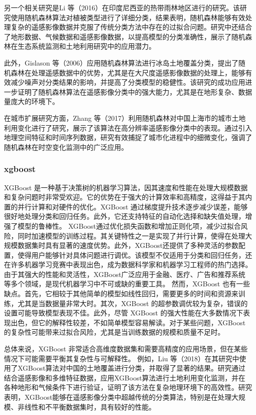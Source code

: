 \documentclass{article}
\begin{document}
	另一个相关研究是Li 等（2016）在印度尼西亚的热带雨林地区进行的研究。该研究使用随机森林算法对植被类型进行了详细分类，结果表明，随机森林能够有效处理复杂的遥感影像数据并克服了传统分类方法中存在的过拟合问题。研究中还结合了地形数据、气候数据和遥感影像数据，以提高模型的分类准确性，展示了随机森林在生态系统监测和土地利用研究中的应用潜力。
	
	此外，Gislason 等（2006）应用随机森林算法进行冰岛土地覆盖分类，提出了随机森林在处理遥感数据中的优势，尤其是在大尺度遥感影像数据的处理上，能够有效减少噪声对分类结果的影响，并提高了分类模型的稳健性。该研究的成功应用进一步证明了随机森林算法在遥感影像分类中的强大能力，尤其是在地形复杂、数据量庞大的环境下。
	
	在城市扩展研究方面，Zhang 等（2017）利用随机森林对中国上海市的城市土地利用变化进行了研究，展示了该算法在高分辨率遥感影像分类中的表现。通过引入地理空间特征和时间序列数据，研究有效捕捉了城市化进程中的细微变化，强调了随机森林在时空变化监测中的广泛应用。
	
	
	\subsubsection{xgboost}
	XGBoost 是一种基于决策树的机器学习算法，因其速度和性能在处理大规模数据和复杂问题时非常受欢迎。它的优势在于强大的计算效率和高精度，这得益于其内置的并行计算和对硬件的优化。XGBoost 通过梯度提升技术逐步减少误差，能够很好地处理分类和回归任务。此外，它还支持特征的自动化选择和缺失值处理，增强了模型的鲁棒性。
	XGBoost通过优化损失函数和增加正则化项，减少过拟合风险，同时加速模型的训练过程。其关键特性之一是实现了并行计算，使得在处理大规模数据集时具有显著的速度优势。此外，XGBoost还提供了多种灵活的参数配置，使得用户能够针对具体问题进行调优。该模型不仅适用于分类和回归任务，还在许多机器学习竞赛中表现出色，成为数据科学家和机器学习工程师的热门选择。由于其强大的性能和灵活性，XGBoost广泛应用于金融、医疗、广告和推荐系统等多个领域，是现代机器学习中不可或缺的重要工具。
	然而，XGBoost 也有一些缺点。首先，它相较于其他简单的模型如线性回归，需要更多的时间和资源来训练，尤其是当数据量非常大时。其次，XGBoost 的超参数调优较为复杂，错误的设置可能导致模型表现不佳。此外，尽管 XGBoost 的强大性能在大多数情况下表现出色，但它的解释性较差，不如简单模型容易解读。对于某些问题，XGBoost 的复杂性可能带来过拟合风险，尤其是当训练数据的规模和质量不足时。
	
	
	总体来说，XGBoost 非常适合高维度数据集和需要高精度的应用场景，但在某些情况下可能需要平衡其复杂性与可解释性。
		例如，Liu 等（2018）在其研究中使用了XGBoost算法对中国的土地覆盖进行分类，并取得了显著的结果。研究通过结合遥感影像和多维特征数据，应用XGBoost算法进行土地利用变化监测，并在各种地形和气候条件下进行验证，证明了该方法在复杂地理环境下的高效性。研究表明，XGBoost能够在遥感影像分类中超越传统的分类算法，特别是在处理大规模、非线性和不平衡数据集时，具有较好的性能。
	
\end{document}

